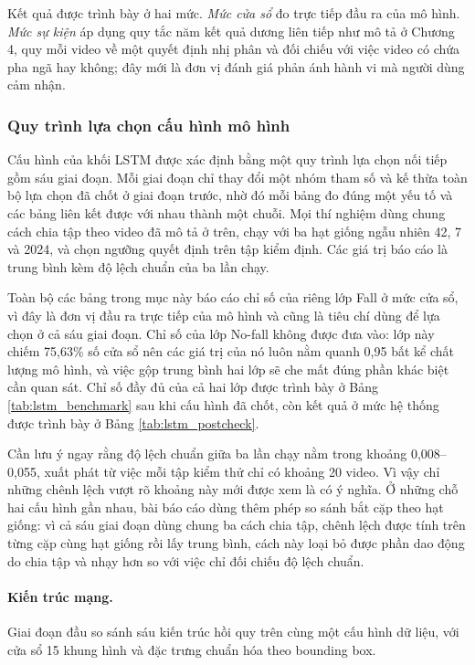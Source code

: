 Kết quả được trình bày ở hai mức. \textit{Mức cửa sổ} đo trực tiếp đầu ra của mô hình. \textit{Mức sự kiện} áp dụng quy tắc năm kết quả dương liên tiếp như mô tả ở Chương 4, quy mỗi video về một quyết định nhị phân và đối chiếu với việc video có chứa pha ngã hay không; đây mới là đơn vị đánh giá phản ánh hành vi mà người dùng cảm nhận.

\subsubsection{Quy trình lựa chọn cấu hình mô hình}
\label{subsec:lstm_config_selection}

Cấu hình của khối LSTM được xác định bằng một quy trình lựa chọn nối tiếp gồm sáu giai đoạn. Mỗi giai đoạn chỉ thay đổi một nhóm tham số và kế thừa toàn bộ lựa chọn đã chốt ở giai đoạn trước, nhờ đó mỗi bảng đo đúng một yếu tố và các bảng liên kết được với nhau thành một chuỗi. Mọi thí nghiệm dùng chung cách chia tập theo video đã mô tả ở trên, chạy với ba hạt giống ngẫu nhiên 42, 7 và 2024, và chọn ngưỡng quyết định trên tập kiểm định. Các giá trị báo cáo là trung bình kèm độ lệch chuẩn của ba lần chạy.

Toàn bộ các bảng trong mục này báo cáo chỉ số của riêng lớp Fall ở mức cửa sổ, vì đây là đơn vị đầu ra trực tiếp của mô hình và cũng là tiêu chí dùng để lựa chọn ở cả sáu giai đoạn. Chỉ số của lớp No-fall không được đưa vào: lớp này chiếm 75,63\% số cửa sổ nên các giá trị của nó luôn nằm quanh 0,95 bất kể chất lượng mô hình, và việc gộp trung bình hai lớp sẽ che mất đúng phần khác biệt cần quan sát. Chỉ số đầy đủ của cả hai lớp được trình bày ở Bảng \ref{tab:lstm_benchmark} sau khi cấu hình đã chốt, còn kết quả ở mức hệ thống được trình bày ở Bảng \ref{tab:lstm_postcheck}.

Cần lưu ý ngay rằng độ lệch chuẩn giữa ba lần chạy nằm trong khoảng 0,008--0,055, xuất phát từ việc mỗi tập kiểm thử chỉ có khoảng 20 video. Vì vậy chỉ những chênh lệch vượt rõ khoảng này mới được xem là có ý nghĩa. Ở những chỗ hai cấu hình gần nhau, bài báo cáo dùng thêm phép so sánh bắt cặp theo hạt giống: vì cả sáu giai đoạn dùng chung ba cách chia tập, chênh lệch được tính trên từng cặp cùng hạt giống rồi lấy trung bình, cách này loại bỏ được phần dao động do chia tập và nhạy hơn so với việc chỉ đối chiếu độ lệch chuẩn.

\paragraph{Kiến trúc mạng.}
Giai đoạn đầu so sánh sáu kiến trúc hồi quy trên cùng một cấu hình dữ liệu, với cửa sổ 15 khung hình và đặc trưng chuẩn hóa theo bounding box.

